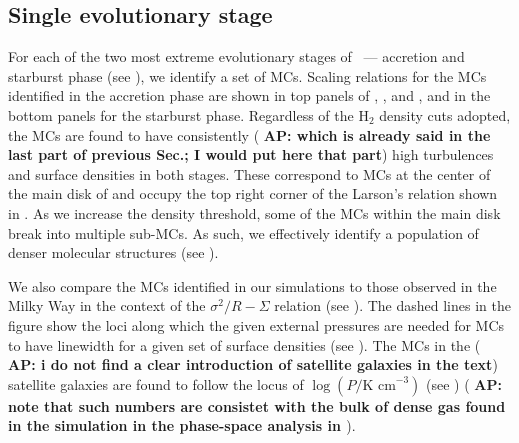 \IfFileExists{emulateapjlegacy.cls}{\documentclass[iop]{emulateapjlegacy}}{\documentclass[iop]{emulateapj}}
\newcommand{\AP}[1]{({\bf \color{apcolor} AP: #1})}
\begin{document}
\subsection{Single evolutionary stage}  \label{sec:singless}

For each of the two most extreme evolutionary stages of \flower\ --- accretion and starburst phase (see ), we identify a set of MCs.
%
Scaling relations for the MCs identified in the accretion phase are shown in top panels of , , and , and in the bottom panels for the starburst phase.
%
Regardless of the H$_2$ density cuts adopted, the MCs are found to have consistently \AP{which is already said in the last part of previous Sec.; I would put here that part} high turbulences and surface densities in both stages. These correspond to MCs at the center of the main disk of \flower and occupy the top right corner of the Larson's relation shown in .
%
As we increase the density threshold, some of the MCs within the main disk break into multiple sub-MCs. As such, we effectively identify a population of denser molecular structures (see ).

We also compare the MCs identified in our simulations to those observed in the Milky Way in the context of the $\sigma^2/R - \Sigma$ relation (see ). The dashed lines in the figure show the loci along which the given external pressures are needed for MCs to have linewidth for a given set of surface densities (see ).
The MCs in the \AP{i do not find a clear introduction of satellite galaxies in the text} satellite galaxies are found to follow the locus of $\log{(P/\textrm{K cm}^{-3})}$ (see ) \AP{note that such numbers are consistet with the bulk of dense gas found in the simulation in the phase-space analysis in \citet{Pallottini17a}}.
\end{document}
